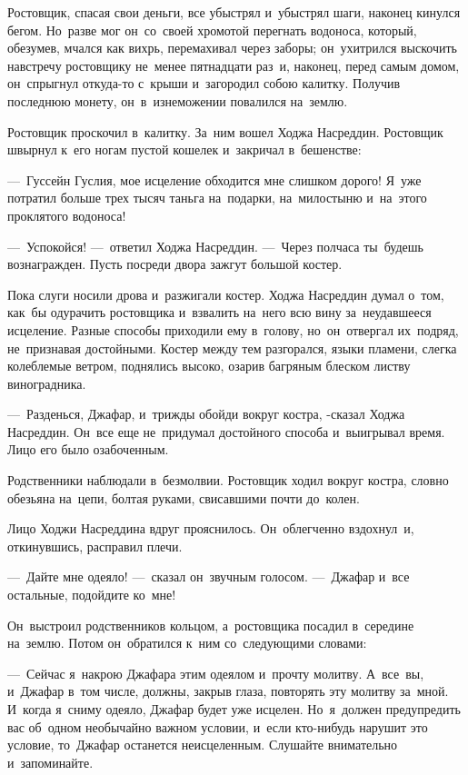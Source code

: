 \documentclass[12pt,a4paper]{book}
\begin{document}
Ростовщик, спасая свои деньги, все убыстрял и~убыстрял шаги, наконец кинулся бегом. Но~разве мог он~со~своей хромотой перегнать водоноса, который, обезумев, мчался как вихрь, перемахивал через заборы; он~ухитрился выскочить навстречу ростовщику не~менее пятнадцати раз~и, наконец, перед самым домом, он~спрыгнул откуда-то с~крыши и~загородил собою калитку. Получив последнюю монету, он~в~изнеможении повалился на~землю.

Ростовщик проскочил в~калитку. За~ним вошел Ходжа Насреддин. Ростовщик швырнул к~его ногам пустой кошелек и~закричал в~бешенстве:

—~Гуссейн Гуслия, мое исцеление обходится мне слишком дорого! Я~уже потратил больше трех тысяч таньга на~подарки, на~милостыню и~на~этого проклятого водоноса!

—~Успокойся! —~ответил Ходжа Насреддин. —~Через полчаса ты~будешь вознагражден. Пусть посреди двора зажгут большой костер.

Пока слуги носили дрова и~разжигали костер. Ходжа Насреддин думал о~том, как~бы одурачить ростовщика и~взвалить на~него всю вину за~неудавшееся исцеление. Разные способы приходили ему в~голову, но~он~отвергал их~подряд, не~признавая достойными. Костер между тем разгорался, языки пламени, слегка колеблемые ветром, поднялись высоко, озарив багряным блеском листву виноградника.

—~Разденься, Джафар, и~трижды обойди вокруг костра, -сказал Ходжа Насреддин. Он~все еще не~придумал достойного способа и~выигрывал время. Лицо его было озабоченным.

Родственники наблюдали в~безмолвии. Ростовщик ходил вокруг костра, словно обезьяна на~цепи, болтая руками, свисавшими почти до~колен.

Лицо Ходжи Насреддина вдруг прояснилось. Он~облегченно вздохнул~и, откинувшись, расправил плечи.

—~Дайте мне одеяло! —~сказал он~звучным голосом. —~Джафар и~все остальные, подойдите ко~мне!

Он~выстроил родственников кольцом, а~ростовщика посадил в~середине на~землю. Потом он~обратился к~ним со~следующими словами:

—~Сейчас я~накрою Джафара этим одеялом и~прочту молитву. А~все~вы, и~Джафар в~том числе, должны, закрыв глаза, повторять эту молитву за~мной. И~когда я~сниму одеяло, Джафар будет уже исцелен. Но~я~должен предупредить вас об~одном необычайно важном условии, и~если кто-нибудь нарушит это условие, то~Джафар останется неисцеленным. Слушайте внимательно и~запоминайте.
\end{document}
